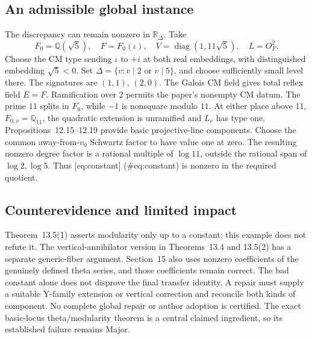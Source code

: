 \documentclass[10pt]{article}
\begin{document}
\subsection*{An admissible global instance}
The discrepancy can remain nonzero in \(\mathbb R_\Delta\). Take \[F_0=\mathbb Q(\sqrt5),\quad F=F_0(\iota),\quad
 V=\operatorname{diag}(1,11\sqrt5),\quad L=O_F^2.\] Choose the CM type sending \(\iota\) to \(+i\) at both real embeddings, with distinguished embedding \(\sqrt5<0\). Set \(\Delta=\{v:v\mid2\text{ or }v\mid5\}\), and choose sufficiently small level there. The signatures are \((1,1)\), \((2,0)\). The Galois CM field gives total reflex field \(E=F\). Ramification over \(2\) permits the paper’s nonempty CM datum. The prime \(11\) splits in \(F_0\), while \(-1\) is nonsquare modulo \(11\). At either place above \(11\), \(F_{0,v}=\mathbb Q_{11}\), the quadratic extension is unramified and \(L_v\) has type one. Propositions 12.15–12.19 provide basic projective-line components. Choose the common away-from-\(v_0\) Schwartz factor to have value one at zero. The resulting nonzero degree factor is a rational multiple of \(\log11\), outside the rational span of \(\log2,\log5\). Thus [eq:constant] (\#eq:constant) is nonzero in the required quotient.\par
\subsection*{Counterevidence and limited impact}
Theorem 13.5(1) asserts modularity only up to a constant; this example does not refute it. The vertical-annihilator version in Theorems 13.4 and 13.5(2) has a separate generic-fiber argument. Section 15 also uses nonzero coefficients of the genuinely defined theta series, and those coefficients remain correct. The bad constant alone does not disprove the final transfer identity. A repair must supply a suitable Y-family extension or vertical correction and reconcile both kinds of component. No complete global repair or author adoption is certified. The exact basic-locus theta/modularity theorem is a central claimed ingredient, so its established failure remains Major.\par
\end{document}
